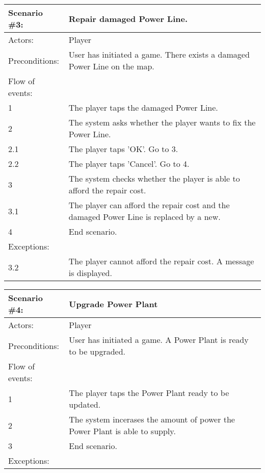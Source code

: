 \begin{tabular}{| l | p{10cm} |}
	\hline
	{\bf Scenario \#3:} & {\bf Repair damaged Power Line.} \\ \hline
	Actors: & Player \\ \hline
	Preconditions: & User has initiated a game. There exists a damaged Power Line on the map. \\ \hline
	Flow of events: & \\ \hline
	1 & The player taps the damaged Power Line. \\ \hline
	2 & The system asks whether the player wants to fix the Power Line. \\ \hline
	2.1 & The player taps 'OK'. Go to 3. \\ \hline
	2.2 & The player taps 'Cancel'. Go to 4. \\ \hline
	3 & The system checks whether the player is able to afford the repair cost. \\ \hline
	3.1 & The player can afford the repair cost and the damaged Power Line is replaced by a new. \\ \hline
	4 & End scenario. \\ \hline
	Exceptions: & \\ \hline
	3.2 & The player cannot afford the repair cost. A message is displayed. \\ \hline
\end{tabular}

\begin{tabular}{| l | p{10cm} |}
	\hline
	{\bf Scenario \#4:} & {\bf Upgrade Power Plant} \\ \hline
	Actors: & Player \\ \hline
	Preconditions: & User has initiated a game. A Power Plant is ready to be upgraded. \\ \hline
	Flow of events: & \\ \hline
	1 & The player taps the Power Plant ready to be updated. \\ \hline
	2 & The system incerases the amount of power the Power Plant is able to supply. \\ \hline
	3 & End scenario. \\ \hline
	Exceptions: & \\ \hline
\end{tabular}

